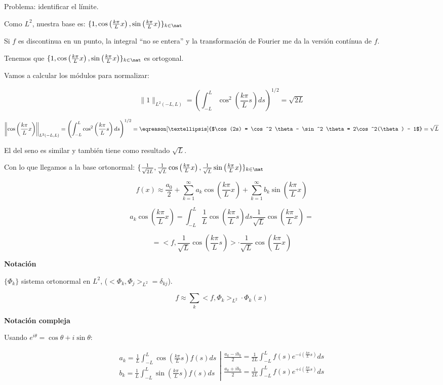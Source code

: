 		Problema: identificar el límite.

		Como $L^2$, nuestra base es: $\{1, \cos \left( \frac{k \pi}{L} x \right), \sin \left( \frac{k \pi}{L} x \right)\}_{k \in \nat}$

		\obs Si $f$ es discontinua en un punto, la integral ``no se entera'' y la transformación de Fourier me da la versión contínua de $f$.

		Tenemos que $\{1, \cos \left( \frac{k \pi}{L} x \right), \sin \left( \frac{k \pi}{L} x \right)\}_{k \in \nat}$ es ortogonal.

		Vamos a calcular los módulos para normalizar:

		\[\|1\|_{L^2 (-L,L)} = \left( \int_{-L}^L \cos^2  \left( \frac{k \pi}{L} s \right) ds \right)^{1/2} = \sqrt{2L} \]

		\[\left\|\cos \left( \frac{k \pi}{L} x \right)\right\|_{L^2 (-L,L)} = \left( \int_{-L}^L \cos^2  \left( \frac{k \pi}{L} s \right) ds \right)^{1/2} = \eqreason[…]{$\cos(2s) = \cos^2 \theta - \sin^2 \theta = 2\cos^2(\theta) - 1$}  = \sqrt{L} \]

		El del seno es similar y también tiene como resultado $\sqrt{L}$.

		Con lo que llegamos a la base ortonormal: $\{\frac{1}{\sqrt{2L}}, \frac{1}{\sqrt{L}} \cos \left( \frac{k \pi}{L} x \right),\frac{1}{\sqrt{L}} \sin \left( \frac{k \pi}{L} x \right)\}_{k \in \nat}$


		\[ f(x) ≈ \frac{a_0}{2} + \sum_{k=1}^\infty a_k \cos \left( \frac{k \pi}{L} x \right) + \sum_{k=1}^\infty b_k \sin \left( \frac{k \pi}{L} x \right) \]

		\[ a_k \cos \left( \frac{k \pi}{L} x \right) = \int^L_{-L} \frac{1}{L} \cos \left( \frac{k \pi}{L} s \right) ds \frac{1}{\sqrt{L}} \cos \left( \frac{k \pi}{L} x \right) = \]

		\[ = < f, \frac{1}{\sqrt{L}} \cos \left( \frac{k \pi}{L} s \right)> \cdot \frac{1}{\sqrt{L}} \cos \left( \frac{k \pi}{L} x \right) \]


		\textbf{Notación}

		$\{ \Phi_k \} $ sistema ortonormal en $L^2$, ($<\Phi_k,\Phi_j>_{L^2} = \delta_{kj}$).

		\[ f ≈ \sum_k < f, \Phi_k >_{L^2} \cdot \Phi_k (x) \]

		\textbf{Notación compleja}

		Usando $e^{i\theta} = \cos \theta + i \sin \theta$:

		\[
		\left. \begin{array}{r}
			a_k = \frac{1}{L} \int^{L}_{-L} \cos \left( \frac{k \pi}{L} s \right) f(s) ds\\
			b_k = \frac{1}{L} \int^{L}_{-L} \sin \left( \frac{k \pi}{L} s \right) f(s) ds
		\end{array} \right| \begin{array}{l}
			\frac{a_k - ib_k}{2} = \frac{1}{2L} \int_{-L}^L f(s) e^{-i \left( \frac{k \pi}{L} s \right)} ds \\
			\frac{a_k + ib_k}{2} = \frac{1}{2L} \int_{-L}^L f(s) e^{+i \left( \frac{k \pi}{L} s \right)} ds \\
		\end{array}
		\]

